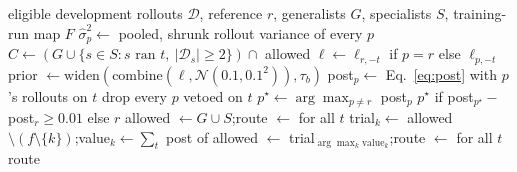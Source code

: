 \documentclass[10pt]{article}
\newcommand{\code}[1]{\texttt{#1}}
\begin{document}
\begin{algorithm}[t]
\caption{Level-based routing for tasks without reference results (\code{select\_by\_level})}
\label{alg:route}
\small
\begin{algorithmic}[1]
\Require eligible development rollouts $\mathcal D$, reference $r$, generalists $G$, specialists $S$, training-run map $F$
\State $\hat\sigma^2_p \gets$ pooled, shrunk rollout variance of every $p$ 
  \State $C \gets (G\cup\{s\in S: s \text{ ran } t,\ |\mathcal D_s|\ge 2\})\cap$ allowed
     \State $\ell \gets \ell_{r,-t}$ if $p=r$ else $\ell_{p,-t}$ 
     \State prior $\gets \mathrm{widen}(\mathrm{combine}(\ell,\mathcal N(0.1,0.1^2)),\tau_b)$
     \State post$_p \gets$ Eq.~\eqref{eq:post} with $p$'s rollouts on $t$
  \EndFor
  \State drop every $p$ vetoed on $t$
  \State $p^\star \gets \arg\max_{p\neq r}$ post$_p$
  \State \Return $p^\star$ if post$_{p^\star}-$post$_r\ge 0.01$ else $r$
\EndFunction
\State allowed $\gets G\cup S$;\quad route $\gets$  for all $t$
   
     \State trial$_k \gets$ allowed $\setminus(f\setminus\{k\})$;\quad value$_k \gets\sum_t$ post of 
  \EndFor
  \State allowed $\gets$ trial$_{\arg\max_k \text{value}_k}$;\quad route $\gets$  for all $t$
\EndWhile
\State \Return route
\end{algorithmic}
\end{algorithm}
\end{document}
